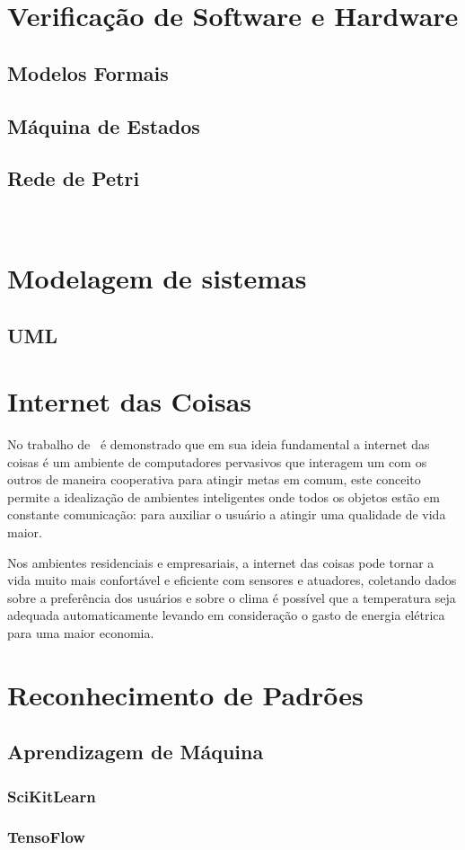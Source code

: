 
\section{Verificação de Software e Hardware}



\subsection{Modelos Formais}


\subsection{Máquina de Estados}


\subsection{Rede de Petri}
~\cite{VALK:2002}

\section{Modelagem de sistemas}

\subsection{UML}

\section{Internet das Coisas}

No trabalho de~\cite{ATZORI:2010} é demonstrado que em sua ideia fundamental a internet das coisas é um ambiente de computadores pervasivos que interagem um com os outros de maneira cooperativa para atingir metas em comum, este conceito permite a idealização de ambientes inteligentes onde todos os objetos estão em constante comunicação: para auxiliar o usuário a atingir uma qualidade de vida maior.

Nos ambientes residenciais e empresariais, a internet das coisas pode tornar a vida muito mais confortável e eficiente com sensores e atuadores, coletando dados sobre a preferência dos usuários e sobre o clima é possível que a temperatura seja adequada automaticamente levando em consideração o gasto de energia elétrica para uma maior economia.

\section{Reconhecimento de Padrões}


\subsection{Aprendizagem de Máquina}

\subsubsection{SciKitLearn}

\subsubsection{TensoFlow}
